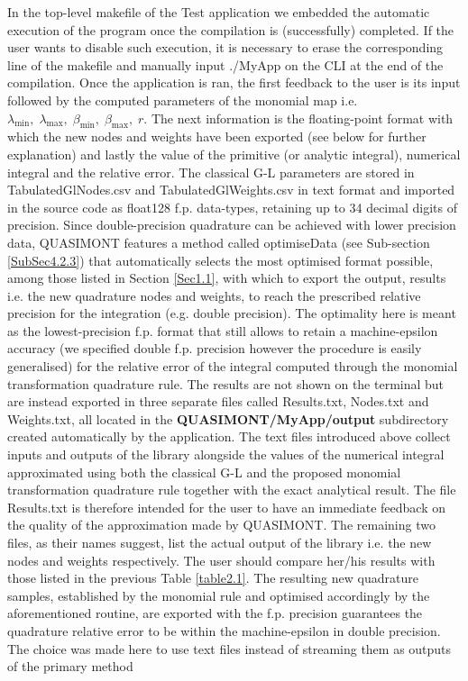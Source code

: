 \documentclass[a4paper, twosided]{book}
\begin{document}
\noindent
In the top-level \colorbox{poliGrayBlue}{makefile} of the \colorbox{poliGrayBlue}{Test} application we embedded the automatic execution of the program once the compilation is (successfully) completed. If the user wants to disable such execution, it is necessary to erase the corresponding line of the \colorbox{poliGrayBlue}{makefile} and manually input \colorbox{poliGrayBlue}{./MyApp} on the CLI at the end of the compilation. Once the application is ran, the first feedback to the user is its input followed by the computed parameters of the monomial map i.e. $\lambda_{\text{min}},\;\lambda_{\text{max}},\;\beta_{\text{min}},\;\beta_{\text{max}},\;r$. The next information is the floating-point format with which the new nodes and weights have been exported (see below for further explanation) and lastly the value of the primitive (or analytic integral), numerical integral and the relative error. The classical G-L parameters are stored in \colorbox{poliGrayBlue}{TabulatedGlNodes.csv} and \colorbox{poliGrayBlue}{TabulatedGlWeights.csv} in text format and imported in the source code as \colorbox{poliGrayBlue}{float128} f.p. data-types, retaining up to 34 decimal digits of precision. Since double-precision quadrature can be achieved with lower precision data, QUASIMONT features a method called \colorbox{poliGrayBlue}{optimiseData} (see Sub-section \ref{SubSec4.2.3}) that automatically selects the most optimised format possible, among those listed in Section \ref{Sec1.1}, with which to export the output, results i.e. the new quadrature nodes and weights, to reach the prescribed relative precision for the integration (e.g. double precision). The optimality here is meant as the lowest-precision f.p. format that still allows to retain a machine-epsilon accuracy (we specified double f.p. precision however the procedure is easily generalised) for the relative error of the integral computed through the monomial  transformation quadrature rule. The results are not shown on the terminal but are instead exported in three separate files called \colorbox{poliGrayBlue}{Results.txt}, \colorbox{poliGrayBlue}{Nodes.txt} and \colorbox{poliGrayBlue}{Weights.txt}, all located in the \colorbox{poliGrayBlue}{\textbf{QUASIMONT/MyApp/output}} subdirectory created automatically by the application. The text files introduced above collect inputs and outputs of the library alongside the values of the numerical integral approximated using both the classical G-L and the proposed monomial transformation quadrature rule together with the exact analytical result. The file \colorbox{poliGrayBlue}{Results.txt} is therefore intended for the user to have an immediate feedback on the quality of the approximation made by QUASIMONT. The remaining two files, as their names suggest, list the actual output of the library i.e. the new nodes and weights respectively. The user should compare her/his results with those listed in the previous Table \ref{table2.1}. The resulting new quadrature samples, established by the monomial rule and optimised accordingly by the aforementioned routine, are exported with the f.p. precision guarantees the quadrature relative error to be within the machine-epsilon in double precision. The choice was made here to use text files instead of streaming them as outputs of the primary method 
\end{document}
